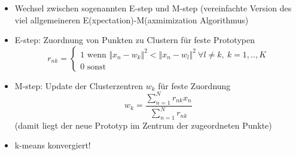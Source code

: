 	\begin{itemize}
		\item Wechsel zwischen sogenannten E-step und M-step (vereinfachte Version des viel allgemeineren E(xpectation)-M(axmimization Algorithmus)
		\item E-step: Zuordnung von Punkten zu Clustern für feste Prototypen
		\begin{equation*}
			r_{nk} = \begin{cases}
				1 \text{ wenn } \Vert x_n-w_k\Vert^2 < \Vert x_n-w_l\Vert^2 ~\forall l\neq k,~ k=1,.., K\\
				0 \text{ sonst}
			\end{cases}
		\end{equation*}
		\item M-step: Update der Clusterzentren $w_k$ für feste Zuordnung
		\begin{equation*}
			w_k= \frac{\sum_{n=1}^Nr_{nk}x_n}{\sum_{n=1}^Nr_{nk}}
		\end{equation*}
		(damit liegt der neue Prototyp im Zentrum der zugeordneten Punkte)
		\item k-means konvergiert!
	\end{itemize}
